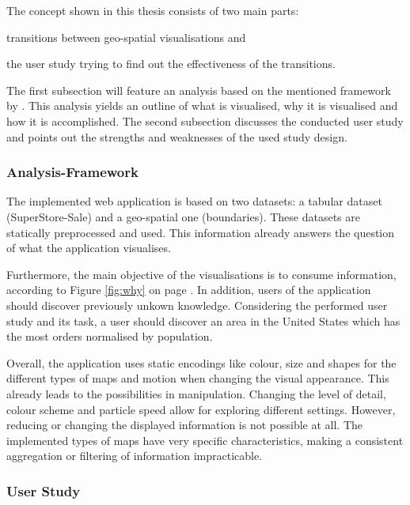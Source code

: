 \cbstart
The concept shown in this thesis consists of two main parts:
\begin{enumerate*}[label={(\arabic*)}]
\item transitions between geo-spatial visualisations and
\item the user study trying to find out the effectiveness of the transitions.
\end{enumerate*}

The first subsection will feature an analysis based on the mentioned framework by \citeauthor{Munzner2014}. This analysis yields an outline of what is visualised, why it is visualised and how it is accomplished. The second subsection discusses the conducted user study and points out the strengths and weaknesses of the used study design.
\cbend

\subsubsection{Analysis-Framework}
The implemented web application is based on two datasets: a tabular dataset (SuperStore-Sale) and a geo-spatial one (boundaries). These datasets are statically preprocessed and used. This information already answers the question of what the application visualises.

\cbstart
Furthermore, the main objective of the visualisations is to consume information, according to Figure \ref{fig:why} on page \pageref{fig:why}. In addition, users of the application should discover previously unkown knowledge. Considering the performed user study and its task, a user should discover an area in the United States which has the most orders normalised by population.
\cbend

Overall, the application uses static encodings like colour, size and shapes for the different types of maps and motion when changing the visual appearance. This already leads to the possibilities in manipulation. Changing the level of detail, colour scheme and particle speed allow for exploring different settings. However, reducing or changing the displayed information is not possible at all. The implemented types of maps have very specific characteristics, making a consistent aggregation or filtering of information impracticable.

\subsubsection{User Study}
\label{s:discussion-study}
